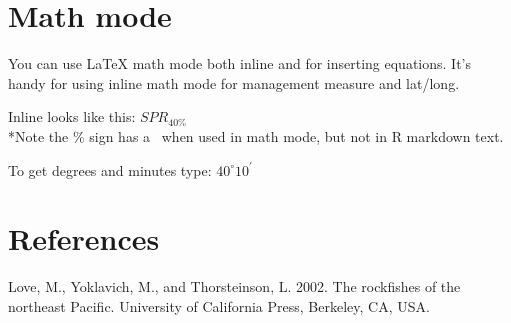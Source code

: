 \documentclass[12pt,]{article}
\begin{document}
\section{Math mode}\label{math-mode}

You can use LaTeX math mode both inline and for inserting equations.
It's handy for using inline math mode for management measure and
lat/long.

Inline looks like this: \(SPR_{40\%}\)\\
*Note the \% sign has a ~when used in math mode, but not in R markdown
text.

To get degrees and minutes type: \(40^\circ 10^\prime\)

\section*{References}\label{references}

\hypertarget{refs}{}
\hypertarget{ref-Love2002}{}
Love, M., Yoklavich, M., and Thorsteinson, L. 2002. The rockfishes of
the northeast Pacific. University of California Press, Berkeley, CA,
USA.
\end{document}
